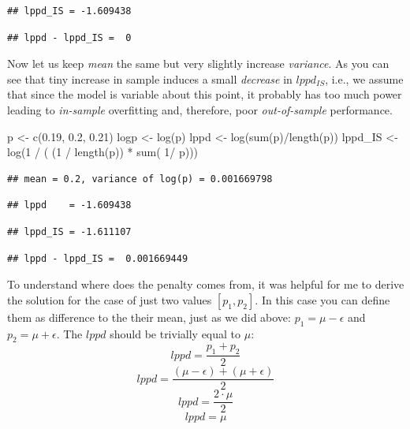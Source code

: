 \documentclass[
]{book}
\newenvironment{Shaded}{\begin{snugshade}}{\end{snugshade}}
\newcommand{\DecValTok}[1]{\textcolor[rgb]{0.00,0.00,0.81}{#1}}
\newcommand{\FloatTok}[1]{\textcolor[rgb]{0.00,0.00,0.81}{#1}}
\newcommand{\FunctionTok}[1]{\textcolor[rgb]{0.00,0.00,0.00}{#1}}
\newcommand{\NormalTok}[1]{#1}
\newcommand{\OtherTok}[1]{\textcolor[rgb]{0.56,0.35,0.01}{#1}}
\newcommand{\SpecialCharTok}[1]{\textcolor[rgb]{0.00,0.00,0.00}{#1}}
\begin{document}
\begin{verbatim}
## lppd_IS = -1.609438
\end{verbatim}

\begin{verbatim}
## lppd - lppd_IS =  0
\end{verbatim}

Now let us keep \emph{mean} the same but very slightly increase \emph{variance}. As you can see that tiny increase in sample induces a small \emph{decrease} in \(lppd_{IS}\), i.e., we assume that since the model is variable about this point, it probably has too much power leading to \emph{in-sample} overfitting and, therefore, poor \emph{out-of-sample} performance.

\begin{Shaded}
\begin{Highlighting}[]
\NormalTok{p }\OtherTok{\textless{}{-}} \FunctionTok{c}\NormalTok{(}\FloatTok{0.19}\NormalTok{, }\FloatTok{0.2}\NormalTok{, }\FloatTok{0.21}\NormalTok{)}
\NormalTok{logp }\OtherTok{\textless{}{-}} \FunctionTok{log}\NormalTok{(p)}
\NormalTok{lppd }\OtherTok{\textless{}{-}} \FunctionTok{log}\NormalTok{(}\FunctionTok{sum}\NormalTok{(p)}\SpecialCharTok{/}\FunctionTok{length}\NormalTok{(p))}
\NormalTok{lppd\_IS }\OtherTok{\textless{}{-}} \FunctionTok{log}\NormalTok{(}\DecValTok{1} \SpecialCharTok{/}\NormalTok{ ( (}\DecValTok{1} \SpecialCharTok{/} \FunctionTok{length}\NormalTok{(p)) }\SpecialCharTok{*} \FunctionTok{sum}\NormalTok{( }\DecValTok{1}\SpecialCharTok{/}\NormalTok{ p)))}
\end{Highlighting}
\end{Shaded}

\begin{verbatim}
## mean = 0.2, variance of log(p) = 0.001669798
\end{verbatim}

\begin{verbatim}
## lppd    = -1.609438
\end{verbatim}

\begin{verbatim}
## lppd_IS = -1.611107
\end{verbatim}

\begin{verbatim}
## lppd - lppd_IS =  0.001669449
\end{verbatim}

To understand where does the penalty comes from, it was helpful for me to derive the solution for the case of just two values \([p_1, p_2]\). In this case you can define them as difference to the their mean, just as we did above: \(p_1 = \mu - \epsilon\) and \(p_2 = \mu + \epsilon\). The \(lppd\) should be trivially equal to \(\mu\):
\[lppd = \frac{p_1 + p_2}{2}\]
\[lppd =\frac{(\mu - \epsilon) + (\mu + \epsilon)}{2}\]
\[lppd =\frac{2 \cdot \mu}{2}\]
\[lppd = \mu\]
\end{document}
